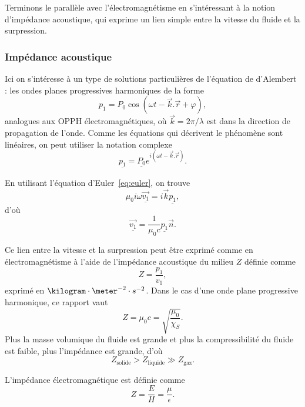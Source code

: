 \begin{transition}
Terminons le parallèle avec l'électromagnétisme en s'intéressant à la notion d'impédance acoustique, qui exprime un lien simple entre la vitesse du fluide et la surpression.
\end{transition}

\subsubsection{Impédance acoustique}

Ici on s'intéresse à un type de solutions particulières de l'équation de d'Alembert : les ondes planes progressives harmoniques de la forme
\begin{equation*}
p_1 = P_0 \cos \left( \omega t - \overrightarrow{k}.\overrightarrow{r} + \varphi \right),
\end{equation*}
analogues aux OPPH électromagnétiques, où $\overrightarrow{k}=2\pi/\lambda$ est dans la direction de propagation de l'onde.
Comme les équations qui décrivent le phénomène sont linéaires, on peut utiliser la notation complexe
\begin{equation}
\underline{p_1} = \underline{P_0} e^{i\left(\omega t - \overrightarrow{k}.\overrightarrow{r}\right)}.
\end{equation}

En utilisant l'équation d'Euler~\ref{eq:euler}, on trouve
\begin{equation*}
\mu_0 i\omega \underline{\overrightarrow{v_1}} = i\overrightarrow{k}\underline{p_1},
\end{equation*}
d'où
\begin{equation}
\underline{\overrightarrow{v_1}} = \frac{1}{\mu_0 c} \underline{p_1} \overrightarrow{n}.
\end{equation}

Ce lien entre la vitesse et la surpression peut être exprimé comme en électromagnétisme à l'aide de l'impédance acoustique du milieu $Z$ définie comme
\begin{equation}
Z = \frac{p_1}{v_1},
\end{equation}
exprimé en $\kilogram \cdot \meter^{-2} \cdot s^{-2}$.
Dans le cas d'une onde plane progressive harmonique, ce rapport vaut
\begin{equation}
Z = \mu_0 c = \sqrt{\frac{\mu_0}{\chi_S}}.
\end{equation}
Plus la masse volumique du fluide est grande et plus la compressibilité du fluide est faible, plus l'impédance est grande, d'où
\begin{equation*}
Z_\mathrm{solide} > Z_\mathrm{liquide} \gg Z_\mathrm{gaz}.
\end{equation*}
\begin{remarque}
L'impédance électromagnétique est définie comme
\begin{equation*}
Z = \frac{E}{H} = \frac{\mu}{\epsilon}.
\end{equation*}
\end{remarque}

